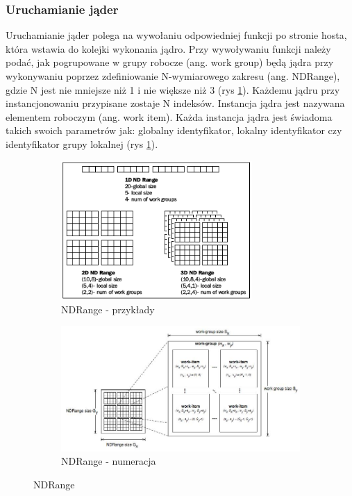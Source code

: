 \documentclass[polish, 12pt]{aghthesis}
\begin{document}
	\subsubsection{Uruchamianie jąder}
	Uruchamianie jąder polega na wywołaniu odpowiedniej funkcji po stronie hosta, która wstawia do kolejki wykonania jądro. Przy wywoływaniu funkcji należy podać, jak pogrupowane w grupy robocze (ang. work group) będą jądra przy wykonywaniu poprzez zdefiniowanie N-wymiarowego zakresu (ang. NDRange), gdzie N jest nie mniejsze niż 1 i nie większe niż 3 (rys \ref{fig:ndrange_examples}). Każdemu jądru przy instancjonowaniu przypisane zostaje N indeksów. Instancja jądra jest nazywana elementem roboczym (ang. work item). Każda instancja jądra jest świadoma takich swoich parametrów jak: globalny identyfikator, lokalny identyfikator czy identyfikator grupy lokalnej (rys \ref{fig:ndrange_examples}).
	
	
	\begin{figure}
	\centering
		\begin{subfigure}[b]{\textwidth}
			\centering
			\includegraphics[width=0.8\textwidth]{ndrange.png}
			\caption{NDRange - przykłady}
			\label{fig:ndrange_examples}
		\end{subfigure}
		\begin{subfigure}[b]{\textwidth}
			\centering
			\includegraphics[width=\textwidth]{ndrange2.jpg}
			\caption{NDRange - numeracja}
			\label{fig:ndrange_numbering}
		\end{subfigure}
		\caption{NDRange}
	\end{figure}
	
\end{document}
